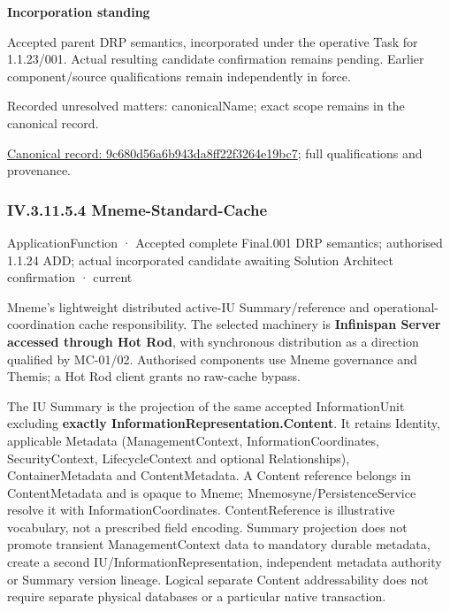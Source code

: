 \par\medskip\textbf{Incorporation standing}\par


Accepted parent DRP semantics, incorporated under the operative Task for 1.1.23/001. Actual resulting candidate confirmation remains pending. Earlier component/source qualifications remain independently in force.


{\small Recorded unresolved matters: canonicalName; exact scope remains in the canonical record.}\par
{\footnotesize \href{../../../../continuum/application/application-function/9c680d56a6b943da8ff22f3264e19bc7.md}{Canonical record: 9c680d56a6b943da8ff22f3264e19bc7}; full qualifications and provenance.}\par
\subsubsection*{IV.3.11.5.4 Mneme-Standard-Cache}
\label{navigation:IV.3.11.5.4}

\label{element:cfe4e0dbe6894a14841452b731ab9cb8}
{\small ApplicationFunction · Accepted complete Final.001 DRP semantics; authorised 1.1.24 ADD; actual incorporated candidate awaiting Solution Architect confirmation · current}\par

Mneme's lightweight distributed active-IU Summary/reference and operational-coordination cache responsibility. The selected machinery is \textbf{Infinispan Server accessed through Hot Rod}, with synchronous distribution as a direction qualified by MC-01/02. Authorised components use Mneme governance and Themis; a Hot Rod client grants no raw-cache bypass.



The IU Summary is the projection of the same accepted InformationUnit excluding \textbf{exactly InformationRepresentation.Content}. It retains Identity, applicable Metadata (ManagementContext, InformationCoordinates, SecurityContext, LifecycleContext and optional Relationships), ContainerMetadata and ContentMetadata. A Content reference belongs in ContentMetadata and is opaque to Mneme; Mnemosyne/PersistenceService resolve it with InformationCoordinates. ContentReference is illustrative vocabulary, not a prescribed field encoding. Summary projection does not promote transient ManagementContext data to mandatory durable metadata, create a second IU/InformationRepresentation, independent metadata authority or Summary version lineage. Logical separate Content addressability does not require separate physical databases or a particular native transaction.



